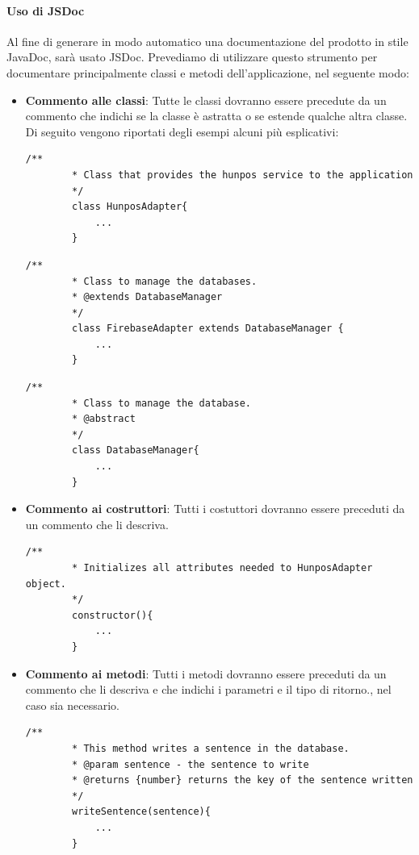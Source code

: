\documentclass[11pt,a4paper]{article}
\begin{document}
{	\paragraph{Uso di JSDoc}
	Al fine di generare in modo automatico una documentazione del prodotto in stile JavaDoc, sarà usato JSDoc.
	Prevediamo di utilizzare questo strumento per documentare principalmente classi e metodi dell'applicazione, nel seguente modo:
	\begin{itemize}
		\item \textbf{Commento alle classi}: Tutte le classi dovranno essere precedute da un commento che indichi se la classe è astratta o se estende qualche altra classe. Di seguito vengono riportati degli esempi alcuni più esplicativi:
		\begin{lstlisting}[caption=Commento ad una classe semplice]
		/**
		* Class that provides the hunpos service to the application
		*/
		class HunposAdapter{
			...
		}
		\end{lstlisting}
			\begin{lstlisting}[caption=Commento ad una classe che ne estende un altra]
		/**
		* Class to manage the databases.
		* @extends DatabaseManager
		*/
		class FirebaseAdapter extends DatabaseManager {
			...
		}
		\end{lstlisting}
		\begin{lstlisting}[caption=Commento ad una classe astratta]
		/**
		* Class to manage the database.
		* @abstract
		*/
		class DatabaseManager{
			...
		}
		\end{lstlisting}
		\item \textbf{Commento ai costruttori}:
		Tutti i costuttori dovranno essere preceduti da un commento che li descriva. 
		\begin{lstlisting}[caption=Commento ad una classe astratta]
		/**
		* Initializes all attributes needed to HunposAdapter object.
		*/
		constructor(){
			...
		}
		\end{lstlisting}
		\item \textbf{Commento ai metodi}:
		Tutti i metodi dovranno essere preceduti da un commento che li descriva e che indichi i parametri e il tipo di ritorno., nel caso sia necessario.
		\begin{lstlisting}[caption=Commento ad un metodo]
		/**
		* This method writes a sentence in the database.
		* @param sentence - the sentence to write
		* @returns {number} returns the key of the sentence written
		*/
		writeSentence(sentence){
			...
		}
		
		\end{lstlisting}
	\end{itemize}
	
}
\end{document}

